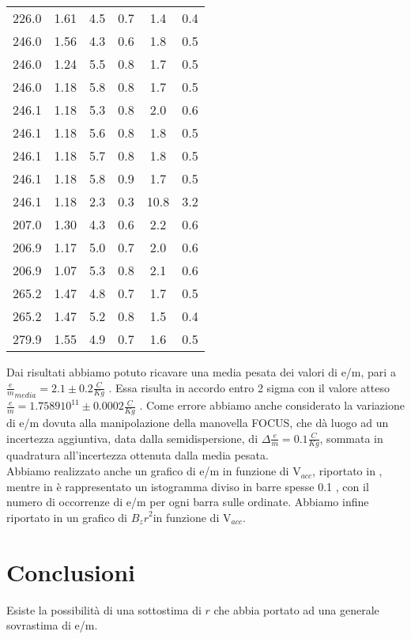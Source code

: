 \begin{table}[h]
\begin{tabular}{*{6}{S[table-figures-exponent = 2]} }
		226.0 & 1.61 & 4.5 & 0.7 & 1.4 & 0.4\\ 
		246.0 & 1.56 & 4.3 & 0.6 & 1.8 & 0.5\\ 
		246.0 & 1.24 & 5.5 & 0.8 & 1.7 & 0.5\\ 
		246.0 & 1.18 & 5.8 & 0.8 & 1.7 & 0.5\\ 
		246.1 & 1.18 & 5.3 & 0.8 & 2.0 & 0.6\\ 
		246.1 & 1.18 & 5.6 & 0.8 & 1.8 & 0.5\\ 
		246.1 & 1.18 & 5.7 & 0.8 & 1.8 & 0.5\\ 
		246.1 & 1.18 & 5.8 & 0.9 & 1.7 & 0.5\\ 
		246.1 & 1.18 & 2.3 & 0.3 & 10.8 & 3.2\\ 
		207.0 & 1.30 & 4.3 & 0.6 & 2.2 & 0.6\\ 
		206.9 & 1.17 & 5.0 & 0.7 & 2.0 & 0.6\\ 
		206.9 & 1.07 & 5.3 & 0.8 & 2.1 & 0.6\\ 
		265.2 & 1.47 & 4.8 & 0.7 & 1.7 & 0.5\\ 
		265.2 & 1.47 & 5.2 & 0.8 & 1.5 & 0.4\\ 
		279.9 & 1.55 & 4.9 & 0.7 & 1.6 & 0.5\\ 
  
 	\end{tabular}
	\caption{ }
	\label{t:tabella2}
\end{table}
Dai risultati abbiamo potuto ricavare una media pesata dei valori di e/m, pari a $\frac{e}{m}_{media} = 2.1 \pm 0.2 \frac{C}{Kg}$ . Essa risulta in accordo entro 2 sigma con il valore atteso $\frac{e}{m} = 1.7589 10^11 \pm 0.0002 \frac{C}{Kg}$ . Come errore abbiamo anche considerato la variazione di e/m dovuta alla manipolazione della manovella FOCUS, che dà luogo ad un incertezza aggiuntiva, data dalla semidispersione, di $\Delta \frac{e}{m} = 0.1 \frac{C}{Kg}$, sommata in quadratura all'incertezza ottenuta dalla media pesata.\\
Abbiamo realizzato anche un grafico di e/m in funzione di V$_{acc}$, riportato in , mentre in  è rappresentato un istogramma diviso in barre spesse 0.1 , con il numero di occorrenze di e/m per ogni barra sulle ordinate. Abbiamo infine riportato in  un grafico di ${B_z r}^2$in funzione di V$_{acc}$.

\section{Conclusioni}
Esiste la possibilità di una sottostima di $r$ che abbia portato ad una generale sovrastima di e/m.